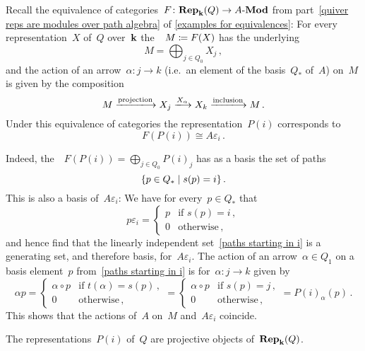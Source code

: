 \begin{remark}
  Recall the equivalence of categories~$F \colon \mathbf{Rep}_{\mathbf{k}}(Q) \to \text{$A$-$\mathbf{Mod}$}$ from part~\ref*{quiver reps are modules over path algebra} of \cref{examples for equivalences}:
  For every representation~$X$ of~$Q$ over~$\mathbf{k}$ the~{}~$M \coloneqq F(X)$ has the underlying~{\kvs}
  \[
    M
    =
    \bigoplus_{j \in Q_0} X_j  \,,
  \]
  and the action of an arrow~$\alpha \colon j \to k$ (i.e.\ an element of the basis~$Q_*$ of~$A$) on~$M$ is given by the composition
  \[
    M
    \xlongto{\text{projection}}
    X_j
    \xlongto{X_\alpha}
    X_k
    \xlongto{\text{inclusion}}
    M \,.
  \]
  Under this equivalence of categories the representation~$P(i)$ corresponds to
  \[
    F(P(i))
    \cong
    A \varepsilon_i \,.
  \]
  
  Indeed, the~{\kvs}~$F(P(i)) = \bigoplus_{j \in Q_0} P(i)_j$ has as a basis the set of paths
  \begin{equation}
  \label{paths starting in i}
    \{
      p \in Q_*
    \suchthat
      s(p) = i
    \}  \,.
  \end{equation}
  This is also a basis of~$A \varepsilon_i$:
  We have for every~$p \in Q_*$ that
  \[
    p \varepsilon_i
    =
    \begin{cases}
      p & \text{if~$s(p) = i$}  \,, \\
      0 & \text{otherwise}  \,,
    \end{cases}
  \]
  and hence find that the linearly independent set~\eqref{paths starting in i} is a generating set, and therefore basis, for~$A \varepsilon_i$.
  The action of an arrow~$\alpha \in Q_1$ on a basis element~$p$ from~\eqref{paths starting in i} is for~$\alpha \colon j \to k$ given by
  \[
    \alpha p
    =
    \begin{cases}
      \alpha \circ p  & \text{if~$t(\alpha) = s(p)$}  \,, \\
      0               & \text{otherwise}  \,,
    \end{cases}
    =
    \begin{cases}
      \alpha \circ p  & \text{if~$s(p) = j$}  \,, \\
      0               & \text{otherwise}  \,,
    \end{cases}
    =
    P(i)_\alpha(p)  \,.
  \]
  This shows that the actions of~$A$ on~$M$ and~$A \varepsilon_i$ coincide.
\end{remark}


\begin{corollary}
  The representations~$P(i)$ of~$Q$ are projective objects of~$\mathbf{Rep}_{\mathbf{k}}(Q)$.
\end{corollary}



